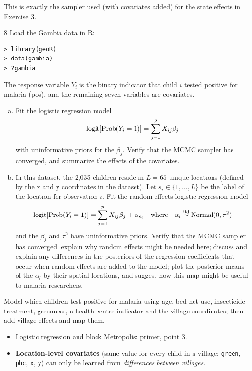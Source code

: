 \documentclass[11pt]{article}
\begin{document}
\begin{takeaway}
This is exactly the sampler used (with covariates added) for the state effects in Exercise 3.
\end{takeaway}


\begin{problem}{8}
Load the Gambia data in R:
\begin{lstlisting}
> library(geoR)
> data(gambia)
> ?gambia
\end{lstlisting}
The response variable $Y_i$ is the binary indicator that child $i$ tested positive for malaria (pos), and the remaining seven variables are covariates.
\begin{enumerate}[(a)]
\item Fit the logistic regression model
\[
\mathrm{logit}[\mathrm{Prob}(Y_i=1)]=\sum_{j=1}^pX_{ij}\beta_j
\]
with uninformative priors for the $\beta_j$. Verify that the MCMC sampler has converged, and summarize the effects of the covariates.
\item In this dataset, the 2,035 children reside in $L=65$ unique locations (defined by the x and y coordinates in the dataset). Let $s_i\in\{1,\dots,L\}$ be the label of the location for observation $i$. Fit the random effects logistic regression model
\[
\mathrm{logit}[\mathrm{Prob}(Y_i=1)]=\sum_{j=1}^pX_{ij}\beta_j+\alpha_{s_i}\quad\text{where}\quad\alpha_l\stackrel{\text{iid}}{\sim}\mathrm{Normal}(0,\tau^2)
\]
and the $\beta_j$ and $\tau^2$ have uninformative priors. Verify that the MCMC sampler has converged; explain why random effects might be needed here; discuss and explain any differences in the posteriors of the regression coefficients that occur when random effects are added to the model; plot the posterior means of the $\alpha_l$ by their spatial locations, and suggest how this map might be useful to malaria researchers.
\end{enumerate}
\end{problem}

\begin{restate}
Model which children test positive for malaria using age, bed-net use, insecticide treatment, greenness, a health-centre indicator and the village coordinates; then add village effects and map them.
\end{restate}

\begin{recall}
\begin{itemize}
\item Logistic regression and block Metropolis: primer, point 3.
\item \textbf{Location-level covariates} (same value for every child in a village: \texttt{green}, \texttt{phc}, \texttt{x}, \texttt{y}) can only be learned from \emph{differences between villages}.
\end{itemize}
\end{recall}
\end{document}

